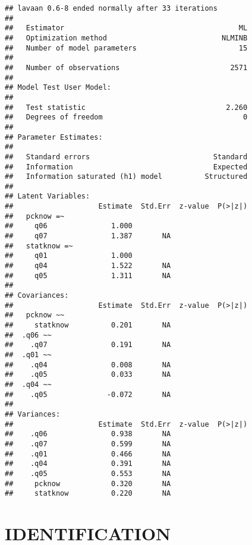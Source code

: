 \documentclass[
]{article}
\begin{document}
\begin{verbatim}
## lavaan 0.6-8 ended normally after 33 iterations
## 
##   Estimator                                         ML
##   Optimization method                           NLMINB
##   Number of model parameters                        15
##                                                       
##   Number of observations                          2571
##                                                       
## Model Test User Model:
##                                                       
##   Test statistic                                 2.260
##   Degrees of freedom                                 0
## 
## Parameter Estimates:
## 
##   Standard errors                             Standard
##   Information                                 Expected
##   Information saturated (h1) model          Structured
## 
## Latent Variables:
##                    Estimate  Std.Err  z-value  P(>|z|)
##   pcknow =~                                           
##     q06               1.000                           
##     q07               1.387       NA                  
##   statknow =~                                         
##     q01               1.000                           
##     q04               1.522       NA                  
##     q05               1.311       NA                  
## 
## Covariances:
##                    Estimate  Std.Err  z-value  P(>|z|)
##   pcknow ~~                                           
##     statknow          0.201       NA                  
##  .q06 ~~                                              
##    .q07               0.191       NA                  
##  .q01 ~~                                              
##    .q04               0.008       NA                  
##    .q05               0.033       NA                  
##  .q04 ~~                                              
##    .q05              -0.072       NA                  
## 
## Variances:
##                    Estimate  Std.Err  z-value  P(>|z|)
##    .q06               0.938       NA                  
##    .q07               0.599       NA                  
##    .q01               0.466       NA                  
##    .q04               0.391       NA                  
##    .q05               0.553       NA                  
##     pcknow            0.320       NA                  
##     statknow          0.220       NA
\end{verbatim}

\hypertarget{identification}{%
\section{IDENTIFICATION}\label{identification}}
\end{document}
